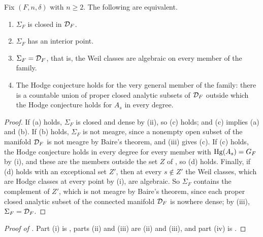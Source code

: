 \begin{corollary}
\label{cor:verygeneral}
Fix $(F,n,\delta)$ with $n\ge2$. The following are equivalent.
\begin{enumerate}[label=\textup{(\alph*)},leftmargin=2.6em,itemsep=2pt]
\item $\Sigma_{F}$ is closed in $\mathcal{D}_{F}$.
\item $\Sigma_{F}$ has an interior point.
\item $\Sigma_{F}=\mathcal{D}_{F}$, that is, the Weil classes are algebraic on every
  member of the family.
\item The Hodge conjecture holds for the very general member of the family:
  there is a countable union of proper closed analytic subsets of $\mathcal{D}_{F}$
  outside which the Hodge conjecture holds for $A_{s}$ in every degree.
\end{enumerate}
\end{corollary}

\begin{proof}
If (a) holds, $\Sigma_{F}$ is closed and dense by
(ii), so (c) holds; and (c) implies (a) and (b). If
(b) holds, $\Sigma_{F}$ is not meagre, since a nonempty open subset of the
manifold $\mathcal{D}_{F}$ is not meagre by Baire's theorem, and
(iii) gives (c). If (c) holds, the Hodge conjecture
holds in every degree for every member with $\operatorname{Hg}(A_{s})=G_{F}$ by
(i), and these are the members outside the set $Z$ of
, so (d) holds. Finally, if (d) holds with an exceptional
set $Z'$, then at every $s\notin Z'$ the Weil classes, which are Hodge classes
at every point by (i), are algebraic. So $\Sigma_{F}$
contains the complement of $Z'$, which is not meagre by Baire's theorem,
since each proper closed analytic subset of the connected manifold $\mathcal{D}_{F}$
is nowhere dense; by (iii), $\Sigma_{F}=\mathcal{D}_{F}$.
\end{proof}

\begin{proof}[Proof of ]
Part (i) is , parts (ii) and (iii) are
(ii) and (iii), and part (iv) is
.
\end{proof}


